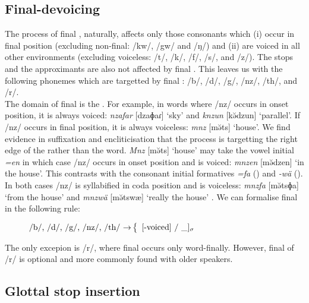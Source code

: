 \subsection{Final-devoicing} \label{final-devoicing-section}

The process of final , naturally, affects only those consonants which (i) occur in final position (excluding non-final: /kw/, /gw/ and /ŋ/) and (ii) are voiced in all other environments (excluding voiceless: /t/, /k/, /f/, /s/, and /z/). The  stops and the approximants are also not affected by final . This leaves us with the following phonemes which are targetted by final : /b/, /d/, /g/, /nz/, /th/, and /r/.\\

The domain of final  is the . For example, in words where /nz/ occurs in onset position, it is always voiced: \emph{nzafar} [dzaɸaɾ] `sky' and \emph{knzun} [kə̆dzun] `parallel'. If /nz/ occurs in final position, it is always voiceless: \emph{mnz} [mə̆ts] `house'. We find evidence in suffixation and encliticisation that the process is targetting the right edge of the  rather than the word. \emph{Mnz} [mə̆ts] `house' may take the vowel initial   \emph{=en} in which case /nz/ occurs in onset position and is voiced: \emph{mnzen} [mə̆dzen] `in the house'. This contrasts with the consonant initial formatives \emph{=fa} (\Abl) and \emph{-wä} (\Emph). In both cases /nz/ is syllabified in coda position and is voiceless: \emph{mnzfa} [mə̆tsɸa] `from the house' and \emph{mnzwä} [mə̆tswæ] `really the house' . We can formalise final  in the following rule:

\begin{figure}
\centering
$\mbox{/b/, /d/, /g/, /nz/, /th/ $\rightarrow$} \left\{
\begin{array}{l}
  \parbox{3,75cm}{[-voiced] / \_]\textsubscript{$\sigma$}} \\
\end{array}
\right.$
\end{figure}%

The only excepion is /r/, where final  occurs only word-finally. However, final  of /r/ is optional and more commonly found with older speakers.

\subsection{Glottal stop insertion} \label{glottal-stop-insertion-section}

